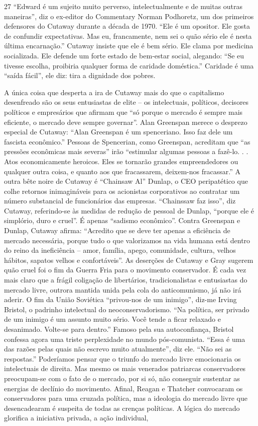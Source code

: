  {\color{blue} 27}  
“Edward é um sujeito muito perverso, intelectualmente e de muitas outras maneiras”, diz o ex-editor do Commentary Norman Podhoretz, um dos primeiros defensores do Cutaway durante a década de 1970. “Ele é um opositor. Ele gosta de confundir expectativas. Mas eu, francamente, nem sei o quão sério ele é nesta última encarnação.” Cutaway insiste que ele é bem sério. Ele clama por medicina socializada. Ele defende um forte estado de bem-estar social, alegando: “Se eu tivesse escolha, proibiria qualquer forma de caridade doméstica.” Caridade é uma “saída fácil”, ele diz: tira a dignidade dos pobres.
 
\par
 
A única coisa que desperta a ira de Cutaway mais do que o capitalismo desenfreado são os seus entusiastas de elite – os intelectuais, políticos, decisores políticos e empresários que afirmam que “só porque o mercado é sempre mais eficiente, o mercado deve sempre governar”. Alan Greenspan merece o desprezo especial de Cutaway: “Alan Greenspan é um spenceriano. Isso faz dele um fascista econômico.” Pessoas de Spencerian, como Greenspan, acreditam que “as pressões econômicas mais severas” irão “estimular algumas pessoas a fazê-lo. . . Atos economicamente heroicos. Eles se tornarão grandes empreendedores ou qualquer outra coisa, e quanto aos que fracassarem, deixem-nos fracassar.” A outra bête noire de Cutaway é “Chainsaw Al” Dunlap, o CEO peripatético que colhe retornos inimagináveis ​​para os acionistas corporativos ao contratar um número substancial de funcionários das empresas. “Chainssaw faz isso”, diz Cutaway, referindo-se às medidas de redução de pessoal de Dunlap, “porque ele é simplório, duro e cruel”. É apenas “sadismo econômico”. Contra Greenspan e Dunlap, Cutaway afirma: “Acredito que se deve ter apenas a eficiência de mercado necessária, porque tudo o que valorizamos na vida humana está dentro do reino da ineficiência – amor, família, apego, comunidade, cultura, velhos hábitos, sapatos velhos e confortáveis”. As deserções de Cutaway e Gray sugerem quão cruel foi o fim da Guerra Fria para o movimento conservador. É cada vez mais claro que a frágil coligação de libertários, tradicionalistas e entusiastas do mercado livre, outrora mantida unida pela cola do anticomunismo, já não irá aderir. O fim da União Soviética “privou-nos de um inimigo”, diz-me Irving Bristol, o padrinho intelectual do neoconservadorismo. “Na política, ser privado de um inimigo é um assunto muito sério. Você tende a ficar relaxado e desanimado. Volte-se para dentro.” Famoso pela sua autoconfiança, Bristol confessa agora uma triste perplexidade no mundo pós-comunista. “Essa é uma das razões pelas quais não escrevo muito atualmente”, diz ele. “Não sei as respostas.” Poderíamos pensar que o triunfo do mercado livre emocionaria os intelectuais de direita. Mas mesmo os mais venerados patriarcas conservadores preocupam-se com o fato de o mercado, por si só, não conseguir sustentar as energias de declínio do movimento. Afinal, Reagan e Thatcher convocaram os conservadores para uma cruzada política, mas a ideologia do mercado livre que desencadearam é suspeita de todas as crenças políticas. A lógica do mercado glorifica a iniciativa privada, a ação individual, 